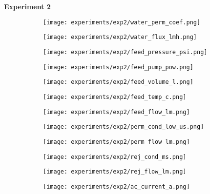 \documentclass{article}
\begin{document}
    \pagebreak
    
    \textbf{Experiment 2}
    \begin{figure}[H]
        \centering
        \begin{subfigure}{0.48\linewidth}
		    \texttt{[image: experiments/exp2/water\_perm\_coef.png]}
	    \end{subfigure}
	    \begin{subfigure}{0.48\linewidth}
		    \texttt{[image: experiments/exp2/water\_flux\_lmh.png]}
	    \end{subfigure}
	    \begin{subfigure}{0.48\linewidth}
		    \texttt{[image: experiments/exp2/feed\_pressure\_psi.png]}
	    \end{subfigure}
	    \begin{subfigure}{0.48\linewidth}
		    \texttt{[image: experiments/exp2/feed\_pump\_pow.png]}
	    \end{subfigure}
	    \begin{subfigure}{0.48\linewidth}
		    \texttt{[image: experiments/exp2/feed\_volume\_l.png]}
	    \end{subfigure}
	    \begin{subfigure}{0.48\linewidth}
		    \texttt{[image: experiments/exp2/feed\_temp\_c.png]}
	    \end{subfigure}
	    \begin{subfigure}{0.48\linewidth}
		    \texttt{[image: experiments/exp2/feed\_flow\_lm.png]}
	    \end{subfigure}
	    \begin{subfigure}{0.48\linewidth}
		    \texttt{[image: experiments/exp2/perm\_cond\_low\_us.png]}
	    \end{subfigure}
	    \begin{subfigure}{0.48\linewidth}
		    \texttt{[image: experiments/exp2/perm\_flow\_lm.png]}
	    \end{subfigure}
	    \begin{subfigure}{0.48\linewidth}
		    \texttt{[image: experiments/exp2/rej\_cond\_ms.png]}
	    \end{subfigure}
	    \begin{subfigure}{0.48\linewidth}
		    \texttt{[image: experiments/exp2/rej\_flow\_lm.png]}
	    \end{subfigure}
	    \begin{subfigure}{0.48\linewidth}
		    \texttt{[image: experiments/exp2/ac\_current\_a.png]}
	    \end{subfigure}
    \end{figure}
    
\end{document}
